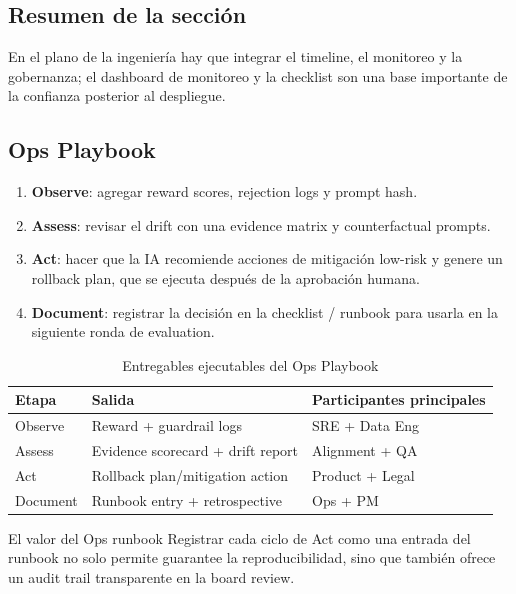 \documentclass[a4paper]{article}
\begin{document}
\subsection{Resumen de la sección}

En el plano de la ingeniería hay que integrar el timeline, el monitoreo y la gobernanza; el dashboard de monitoreo y la checklist son una base importante de la confianza posterior al despliegue.
\subsection{Ops Playbook}

\begin{enumerate}
    \item \textbf{Observe}: agregar reward scores, rejection logs y prompt hash.
    \item \textbf{Assess}: revisar el drift con una evidence matrix y counterfactual prompts.
    \item \textbf{Act}: hacer que la IA recomiende acciones de mitigación low-risk y genere un rollback plan, que se ejecuta después de la aprobación humana.
    \item \textbf{Document}: registrar la decisión en la checklist / runbook para usarla en la siguiente ronda de evaluation.
\end{enumerate}

\begin{table}[H]
\centering
\begin{tabular}{p{} p{} p{}}
\toprule
Etapa & Salida & Participantes principales \\
\midrule
Observe & Reward + guardrail logs & SRE + Data Eng \\
Assess & Evidence scorecard + drift report & Alignment + QA \\
Act & Rollback plan/mitigation action & Product + Legal \\
Document & Runbook entry + retrospective & Ops + PM \\
\bottomrule
\end{tabular}
\caption{Entregables ejecutables del Ops Playbook}
\end{table}

\begin{knowledgebox}{El valor del Ops runbook}
Registrar cada ciclo de Act como una entrada del runbook no solo permite guarantee la reproducibilidad, sino que también ofrece un audit trail transparente en la board review.
\end{knowledgebox}
\end{document}
